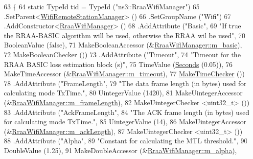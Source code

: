 \begin{DoxyCode}
63 \{
64   \textcolor{keyword}{static} TypeId tid = TypeId (\textcolor{stringliteral}{"ns3::RraaWifiManager"})
65     .SetParent<\hyperlink{classns3_1_1WifiRemoteStationManager_a78524840f5900e1937e8e2d6df48954d}{WifiRemoteStationManager}> ()
66     .SetGroupName (\textcolor{stringliteral}{"Wifi"})
67     .AddConstructor<\hyperlink{classns3_1_1RraaWifiManager_a76acfc1faccec108e565f3e05b7adc59}{RraaWifiManager}> ()
68     .AddAttribute (\textcolor{stringliteral}{"Basic"},
69                    \textcolor{stringliteral}{"If true the RRAA-BASIC algorithm will be used, otherwise the RRAA wil be used"},
70                    BooleanValue (\textcolor{keyword}{false}),
71                    MakeBooleanAccessor (&\hyperlink{classns3_1_1RraaWifiManager_a6855666708a35311f3bd02d614fffc8f}{RraaWifiManager::m\_basic}),
72                    MakeBooleanChecker ())
73     .AddAttribute (\textcolor{stringliteral}{"Timeout"},
74                    \textcolor{stringliteral}{"Timeout for the RRAA BASIC loss estimation block (s)"},
75                    TimeValue (\hyperlink{group__timecivil_ga33c34b816f8ff6628e33d5c8e9713b9e}{Seconds} (0.05)),
76                    MakeTimeAccessor (&\hyperlink{classns3_1_1RraaWifiManager_aded5168ef9f21eea5a9da48dedb99a7c}{RraaWifiManager::m\_timeout}),
77                    \hyperlink{group__time_ga7032965bd4afa578691d88c09e4481c1}{MakeTimeChecker} ())
78     .AddAttribute (\textcolor{stringliteral}{"FrameLength"},
79                    \textcolor{stringliteral}{"The data frame length (in bytes) used for calculating mode TxTime."},
80                    UintegerValue (1420),
81                    MakeUintegerAccessor (&\hyperlink{classns3_1_1RraaWifiManager_a43b8fc3fb7d677b03aaaf6803149b99e}{RraaWifiManager::m\_frameLength}),
82                    MakeUintegerChecker <uint32\_t> ())
83     .AddAttribute (\textcolor{stringliteral}{"AckFrameLength"},
84                    \textcolor{stringliteral}{"The ACK frame length (in bytes) used for calculating mode TxTime."},
85                    UintegerValue (14),
86                    MakeUintegerAccessor (&\hyperlink{classns3_1_1RraaWifiManager_ad99aa645ea8516cfa020d22facb7934d}{RraaWifiManager::m\_ackLength}),
87                    MakeUintegerChecker <uint32\_t> ())
88     .AddAttribute (\textcolor{stringliteral}{"Alpha"},
89                    \textcolor{stringliteral}{"Constant for calculating the MTL threshold."},
90                    DoubleValue (1.25),
91                    MakeDoubleAccessor (&\hyperlink{classns3_1_1RraaWifiManager_ae374e30da98153008fe7ab5e5c4fc841}{RraaWifiManager::m\_alpha}),

\end{DoxyCode}
